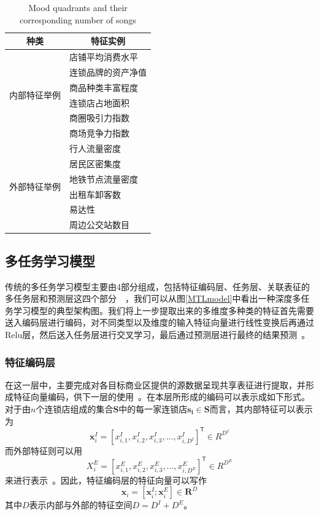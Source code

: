 \documentclass{llncs}
\begin{document}
\begin{table}
	\centering
	\caption{Mood quadrants and their corresponding number of songs}
	\label{feature}
	\begin{tabular}{c|p{8cm}<{\centering}}
		\hline
		\textbf{种类}  & \multicolumn{1}{c}{\textbf{特征实例}}         \\ \hline
		\multirow{6}{*}{内部特征举例} & 店铺平均消费水平 \\ \cline{2-2} 
		                              & 连锁品牌的资产净值 \\ \cline{2-2}
		                              & 商品种类丰富程度   \\ \cline{2-2}
		                              & 连锁店占地面积   \\ \cline{2-2}
		                              & 商圈吸引力指数  \\ \cline{2-2}
									 & 商场竞争力指数   \\ \hline \hline
		\multirow{6}{*}{外部特征举例} & 行人流量密度   \\ \cline{2-2}
									 & 居民区密集度   \\ \cline{2-2}
									 & 地铁节点流量密度   \\ \cline{2-2}
									 & 出租车卸客数   \\ \cline{2-2}
		                             & 易达性       \\ \cline{2-2}
		                             & 周边公交站数目 \\ \hline
	\end{tabular}
\end{table}

\subsection{多任务学习模型}
传统的多任务学习模型主要由4部分组成，包括特征编码层、任务层、关联表征的多任务层和预测层这四个部分~\cite{Caruana1997Multitask}~\cite{Caruana2012A}，我们可以从图\ref{MTLmodel}中看出一种深度多任务学习模型的典型架构图。我们将上一步提取出来的多维度多种类的特征首先需要送入编码层进行编码，对不同类型以及维度的输入特征向量进行线性变换后再通过Relu层，然后送入任务层进行交叉学习，最后通过预测层进行最终的结果预测~\cite{zheng2014urban}。
\subsubsection{特征编码层}
在这一层中，主要完成对各目标商业区提供的源数据呈现共享表征进行提取，并形成特征向量编码，供下一层的使用~\cite{mariani2018business}。在本层所形成的编码可以表示成如下形式。对于由$n$个连锁店组成的集合$\mathbf{S}$中的每一家连锁店$\mathbf{s_i} \in \mathbf{S}$而言，其内部特征可以表示为
$$\mathbf{x}_i^I = [x_{i,1}^I,x_{i,2}^I,x_{i,3}^I,...,x_{i,D^I}^I]^\mathsf{T} \in R^{D^I}$$
而外部特征则可以用
$$X_i^E = [x_{i,1}^E,x_{i,2}^E,x_{i,3}^E,...,x_{i,D^E}^E]^\mathsf{T} \in R^{D^E}$$
来进行表示~\cite{Wang2018Searchable}。因此，特征编码层的特征向量可以写作
$$\mathbf{x}_i = [\mathbf{x}_i^I;\mathbf{x}_i^E] \in \mathbf{R} ^ D$$
其中$D$表示内部与外部的特征空间$D = D^I + D^E$。
\end{document}
